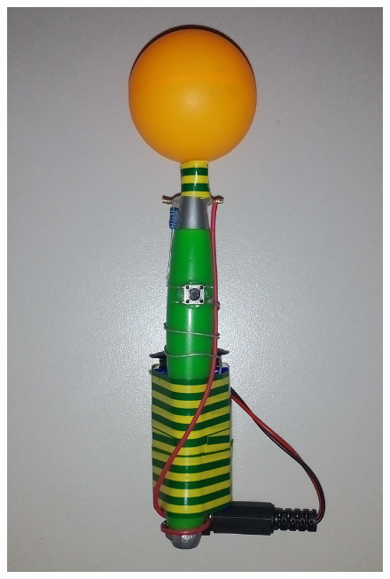 \documentclass[a4paper, 12pt]{book}
\begin{document}
\begin{figure}[H]
\centering
\includegraphics[scale=0.4]{marker_off.png}

\end{figure}
\end{document}
